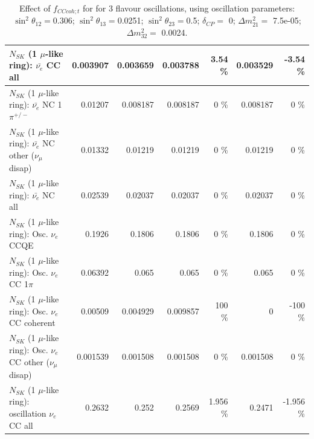 \begin{table}
\begin{tabular}{| l | r | r | r  r | r  r |}
                            $N_{SK}$ (1 $\mu$-like ring): $\bar{\nu_{e}}$ CC all &        0.003907 &        0.003659 &        0.003788 &     3.54 \%  &        0.003529 &    -3.54 \%  \\ 
\hline
                     $N_{SK}$ (1 $\mu$-like ring): $\bar{\nu_e}$ NC 1$\pi^{+/-}$ &         0.01207 &        0.008187 &        0.008187 &        0 \%  &        0.008187 &        0 \%  \\ 
          $N_{SK}$ (1 $\mu$-like ring): $\bar{\nu_e}$ NC other ($\nu_\mu$ disap) &         0.01332 &         0.01219 &         0.01219 &        0 \%  &         0.01219 &        0 \%  \\ 
                            $N_{SK}$ (1 $\mu$-like ring): $\bar{\nu_{e}}$ NC all &         0.02539 &         0.02037 &         0.02037 &        0 \%  &         0.02037 &        0 \%  \\ 
\hline
\hline
\hline
                                 $N_{SK}$ (1 $\mu$-like ring): Osc. $\nu_e$ CCQE &          0.1926 &          0.1806 &          0.1806 &        0 \%  &          0.1806 &        0 \%  \\ 
                            $N_{SK}$ (1 $\mu$-like ring): Osc. $\nu_e$ CC 1$\pi$ &         0.06392 &           0.065 &           0.065 &        0 \%  &           0.065 &        0 \%  \\ 
                          $N_{SK}$ (1 $\mu$-like ring): Osc. $\nu_e$ CC coherent &         0.00509 &        0.004929 &        0.009857 &      100 \%  &               0 &     -100 \%  \\ 
           $N_{SK}$ (1 $\mu$-like ring): Osc. $\nu_e$ CC other ($\nu_\mu$ disap) &        0.001539 &        0.001508 &        0.001508 &        0 \%  &        0.001508 &        0 \%  \\ 
                        $N_{SK}$ (1 $\mu$-like ring): oscillation $\nu_e$ CC all &          0.2632 &           0.252 &          0.2569 &    1.956 \%  &          0.2471 &   -1.956 \%  \\ 
\hline
\hline
\end{tabular}
\caption{ Effect of $f_{CCcoh; t}$ for for 3 flavour oscillations, using oscillation parameters:  $\sin^2\theta_{12} = $0.306; $\sin^2\theta_{13} = $0.0251; $\sin^2\theta_{23} = $0.5; $\delta_{CP} = $        0; $\Delta m^2_{21} = $    7.5e-05; $\Delta m^2_{32} = $    0.0024. }
\label{tab:num_xsec_norm_cccoh_1RmuT_3f_osc_t13:0.0251}
\end{table}
\clearpage

